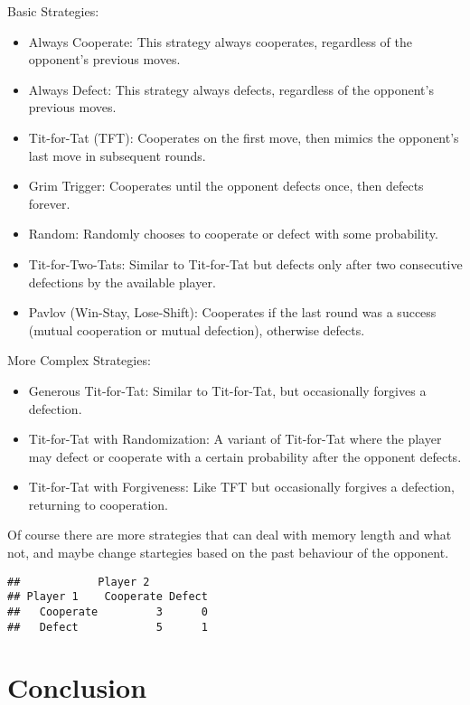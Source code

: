 \documentclass[11pt,preprint]{elsarticle}
\numberwithin{equation}{section}
\numberwithin{figure}{section}
\numberwithin{table}{section}
\begin{document}
Basic Strategies:

\begin{itemize}
\item
  Always Cooperate: This strategy always cooperates, regardless of the
  opponent's previous moves.
\item
  Always Defect: This strategy always defects, regardless of the
  opponent's previous moves.
\item
  Tit-for-Tat (TFT): Cooperates on the first move, then mimics the
  opponent's last move in subsequent rounds.
\item
  Grim Trigger: Cooperates until the opponent defects once, then defects
  forever.
\item
  Random: Randomly chooses to cooperate or defect with some probability.
\item
  Tit-for-Two-Tats: Similar to Tit-for-Tat but defects only after two
  consecutive defections by the available player.
\item
  Pavlov (Win-Stay, Lose-Shift): Cooperates if the last round was a
  success (mutual cooperation or mutual defection), otherwise defects.
\end{itemize}

More Complex Strategies:

\begin{itemize}
\item
  Generous Tit-for-Tat: Similar to Tit-for-Tat, but occasionally
  forgives a defection.
\item
  Tit-for-Tat with Randomization: A variant of Tit-for-Tat where the
  player may defect or cooperate with a certain probability after the
  opponent defects.
\item
  Tit-for-Tat with Forgiveness: Like TFT but occasionally forgives a
  defection, returning to cooperation.
\end{itemize}

Of course there are more strategies that can deal with memory length and
what not, and maybe change startegies based on the past behaviour of the
opponent.

\begin{verbatim}
##            Player 2
## Player 1    Cooperate Defect
##   Cooperate         3      0
##   Defect            5      1
\end{verbatim}

\section{Conclusion}\label{conclusion}
\end{document}
